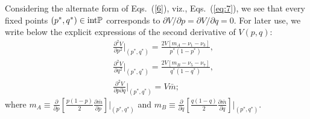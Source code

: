 \documentclass[
 pre,
 aps,
 a4paper,
 english,
 showkeys,
 reprint,
 twocolumn,
 superscriptaddress
]{revtex4}
\begin{document}
Considering the alternate form of Eqs.~(\ref{6}), viz., Eqs.~(\ref{eq:7}), we see that every fixed points $(p^*,q^*)\in {\rm int}\mathbb{P}$ corresponds to  ${\partial V}/{\partial p}={\partial V}/{\partial q}=0$. For later use, we write below the explicit expressions of the second derivative of $V(p,q)$:
\begin{subequations}\label{eq:v2}
	\begin{eqnarray}
	&&\frac{\partial^2V}{\partial p^2}\bigg|_{(p^*,q^*)}=\frac{2V\left[m_A-\nu_1-\nu_3\right]}{p^*(1-p^*)},
	\\&& \frac{\partial^2V}{\partial q^2}\bigg|_{(p^*,q^*)}=\frac{2V\left[m_B-\nu_5-\nu_7\right]}{q^*(1-q^*)},\\&&
	\frac{\partial^2V}{\partial p \partial q}\bigg|_{(p^*,q^*)}=V\bar{m};
	\end{eqnarray}
\end{subequations}
where $m_A \equiv \frac{\partial}{\partial p}\left[\frac{p(1-p)}{2}\frac{\partial \bar{m}}{\partial p}\right]\bigg|_{(p^*,q^*)}$  and $m_B \equiv \frac{\partial}{\partial q}\left[\frac{q(1-q)}{2}\frac{\partial \bar{m}}{\partial q}\right]\bigg|_{(p^*,q^*)}$.
\end{document}
